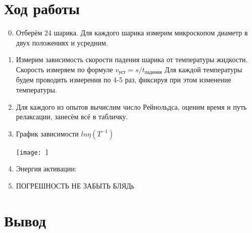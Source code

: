 \documentclass[11pt,a4paper]{article}
\begin{document}
\section*{Ход работы}
\begin{enumerate}
  \setcounter{enumi}{-1}
  \item Отберём 24 шарика. Для каждого шарика измерим микроскопом
  диаметр в двух положениях и усредним.
  \item Измерим зависимость скорости падения шарика от температуры жидкости.
  Скорость измеряем по формуле $v_\text{уст} = s / t_\text{падения}$
  Для каждой температуры будем проводить измерения по 4-5 раз, фиксируя при этом изменение температуры.
  \item Для каждого из опытов вычислим число Рейнольдса, оценим время и путь релаксации,
  занесём всё в табличку.
  \item График зависимости $ln \eta  (T^{-1})$
  \begin{center}
    \texttt{[image: ]}
  \end{center}
  \item Энергия активации:
  \[ \]
  \item ПОГРЕШНОСТЬ НЕ ЗАБЫТЬ БЛЯДь
\end{enumerate}

\section*{Вывод}
\end{document}
